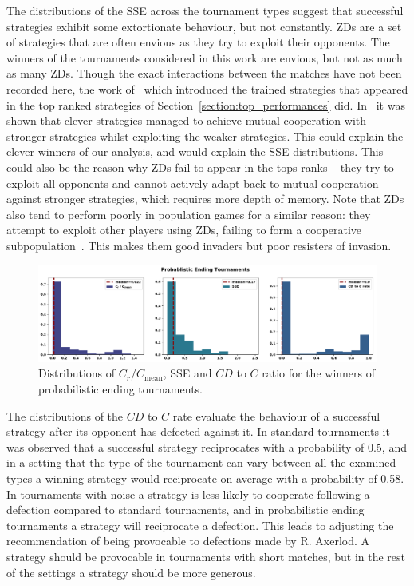 \documentclass{article}
\begin{document}
The distributions of the SSE across the tournament types suggest that successful
strategies exhibit some extortionate behaviour, but not constantly.
ZDs are a set of strategies that are often envious as they try to exploit their
opponents. The winners of the tournaments considered in this work are
envious, but not as much as many ZDs.
Though the exact interactions between the matches have not been recorded here,
the work of~\cite{Harper2017} which introduced the trained strategies that
appeared in the top ranked strategies of Section~\ref{section:top_performances}
did. In~\cite{Harper2017} it was shown that clever strategies managed to achieve
mutual cooperation with stronger strategies whilst exploiting the weaker
strategies. This could explain the clever winners
of our analysis, and would explain the SSE distributions. This could also
be the reason why ZDs fail to appear in the tops ranks -- they try to exploit
all opponents and cannot actively adapt back to mutual cooperation against
stronger strategies, which requires more depth of memory. Note that
ZDs also tend to perform poorly in population games for a similar reason: they
attempt to exploit other players using ZDs, failing to form a cooperative
subpopulation~\cite{Knight2017evolution}. This makes them good invaders but poor resisters of invasion.

\begin{figure}[!htbp]
    \centering
        \centering
        \includegraphics[width=\textwidth]{../images/probend_discussion.pdf}
        \caption{Distributions of \(C_r / C_{\text{mean}}\), SSE and \(CD\) to \(C\) ratio
        for the winners of probabilistic ending tournaments.}
        \label{fig:discussion_probend}
\end{figure}

The distributions of the \(CD\) to \(C\) rate evaluate the behaviour of a
successful strategy after its opponent has defected against it. In standard
tournaments it was observed that a successful strategy reciprocates with a
probability of 0.5, and in a setting that the type
of the tournament can vary between all the examined types a winning strategy
would reciprocate on average with a probability of 0.58. In
tournaments with noise a strategy is less likely to cooperate following a
defection compared to standard tournaments, and in probabilistic ending
tournaments a strategy will reciprocate a defection.
This leads to adjusting the recommendation of being provocable to defections made
by R. Axerlod. A strategy should be provocable in tournaments with short matches,
but in the rest of the settings a strategy should be more generous.
\end{document}
